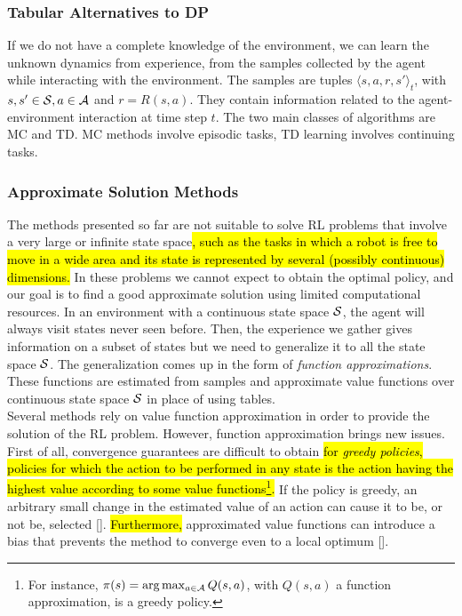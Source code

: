 \subsubsection{Tabular Alternatives to \ac{DP}}\label{subsec:alt}
If we do not have a complete knowledge of the environment, we can learn the unknown dynamics from experience, \ie from the samples collected by the agent while interacting with the environment. The samples are tuples $\langle s,a,r,s' \rangle_t$, with $s, s' \in \mathcal{S}, a \in \mathcal{A}$ and $r = R(s,a)$. They contain information related to the agent-environment interaction at time step $t$. The two main classes of algorithms are \acf{MC} and \acf{TD}. \ac{MC} methods involve episodic tasks, \ac{TD} learning involves continuing tasks. 

\subsubsection{Approximate Solution Methods}
The methods presented so far are not suitable to solve \ac{RL} problems that involve a very large or infinite state space\hl{, such as the tasks in which a robot is free to move in a wide area and its state is represented by several (possibly continuous) dimensions.} In these problems we cannot expect to obtain the optimal policy, and our goal is to find a good approximate solution using limited computational resources. In an environment with a continuous state space $\mathcal{S}$, the agent will always visit states never seen before. Then, the experience we gather gives information on a subset of states but we need to generalize it to all the state space $\mathcal{S}$. The generalization comes up in the form of \emph{function approximations}. These functions are estimated from samples and approximate value functions over continuous state space $\mathcal{S}$ in place of using tables.\\
\newline
Several methods rely on value function approximation in order to provide the solution of the \ac{RL} problem. However, function approximation brings new issues. First of all, convergence guarantees are difficult to obtain \hl{for \emph{greedy policies},} \ie \hl{policies for which the action to be performed in any state is the action having the highest value according to some value functions\footnote{For instance, $\pi(s) = \arg \max_{a \in \mathcal{A}}Q(s,a)$, with $Q(s,a)$ a function approximation, is a greedy policy.}.} If the policy is greedy, an arbitrary small change in the estimated value of an action can cause it to be, or not be, selected [\citet{Sutton1999PolicyGM}]. \hl{Furthermore,} approximated value functions can introduce a bias that prevents the method to converge even to a local optimum [\cite{deisenroth2013Survey}]. 

